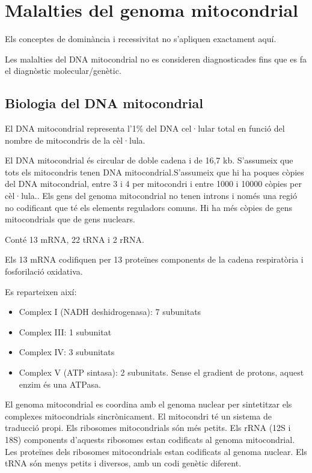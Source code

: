 \section{Malalties del genoma mitocondrial}
\label{sec:mitocondrial}

Els conceptes de dominància i recessivitat no s'apliquen exactament aquí.

Les malalties del DNA mitocondrial no es consideren diagnosticades fins que es fa el diagnòstic molecular/genètic.

\subsection{Biologia del DNA mitocondrial}
\label{sec:dnamitocondrial}

El DNA mitocondrial representa l'1\% del DNA cel·lular total en funció del nombre de mitocondris de la cèl·lula.

El DNA mitocondrial és circular de doble cadena i de 16,7 kb. S'assumeix que tots els mitocondris tenen DNA mitocondrial.S'assumeix que hi ha poques còpies del DNA mitocondrial, entre 3 i 4 per mitocondri i entre 1000 i 10000 còpies per cèl·lula.. Els gens del genoma mitocondrial no tenen introns i només una regió no codificant que té els elements reguladors comuns. Hi ha més còpies de gens mitocondrials que de gens nuclears.

Conté 13 mRNA, 22 tRNA i 2 rRNA.

Els 13 mRNA codifiquen per 13 proteïnes components de la cadena respiratòria i fosforilació oxidativa. %

Es reparteixen així:
\begin{itemize}
\item Complex I (NADH deshidrogenasa): 7 subunitats
\item Complex III: 1 subunitat
\item Complex IV: 3 subunitats
\item Complex V (ATP sintasa): 2 subunitats. Sense el gradient de protons, aquest enzim és una ATPasa.
\end{itemize}

El genoma mitocondrial es coordina amb el genoma nuclear per sintetitzar els complexes mitocondrials sincrònicament. El mitocondri té un sistema de traducció propi. Els ribosomes mitocondrials són més petits. Els rRNA (12S i 18S) components d'aquests ribosomes estan codificats al genoma mitocondrial. Les proteïnes dels ribosomes mitocondrials estan codificats al genoma nuclear. Els tRNA són menys petits i diversos, amb un codi genètic diferent.

